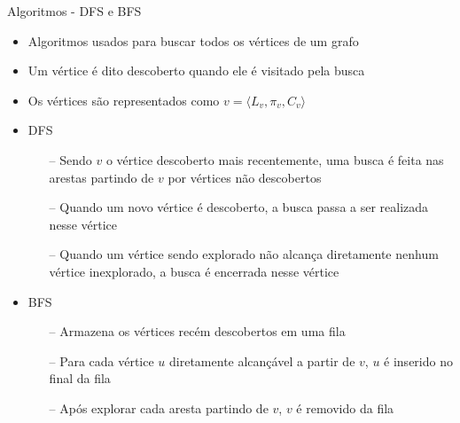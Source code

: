 \begin{frame}{Algoritmos - DFS e BFS}
    \begin{itemize}
        \item Algoritmos usados para buscar todos os vértices de um grafo
        \item Um vértice é dito descoberto quando ele é visitado pela busca
        \item Os vértices são representados como $v = \langle L_v, \pi_v, C_v \rangle$
        \item DFS
        \begin{itemize}
            \item [--] Sendo $v$ o vértice descoberto mais recentemente, uma busca é feita nas arestas partindo de $v$ por vértices não descobertos
            \item [--] Quando um novo vértice é descoberto, a busca passa a ser realizada nesse vértice
            \item [--] Quando um vértice sendo explorado não alcança diretamente nenhum vértice inexplorado, a busca é encerrada nesse vértice
        \end{itemize}
        \item BFS
        \begin{itemize}
            \item [--] Armazena os vértices recém descobertos em uma fila
            \item [--] Para cada vértice $u$ diretamente alcançável a partir de $v$, $u$ é inserido no final da fila
            \item [--] Após explorar cada aresta partindo de $v$, $v$ é removido da fila
        \end{itemize}
    \end{itemize}


\end{frame}